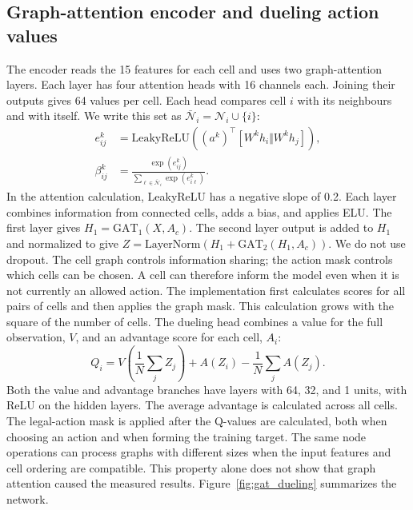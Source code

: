 \documentclass[fleqn,10pt,twoside]{IOEGC}
\begin{document}
\subsection{Graph-attention encoder and dueling action values}
The encoder reads the 15 features for each cell and uses two graph-attention layers. Each layer has four attention heads with 16 channels each. Joining their outputs gives 64 values per cell. Each head compares cell $i$ with its neighbours and with itself. We write this set as $\bar{\mathcal{N}}_i=\mathcal{N}_i\cup\{i\}$:
\begin{equation}
\begin{aligned}
 e_{ij}^{k}&=\mathrm{LeakyReLU}\!\left((a^k)^\top[W^kh_i\Vert W^kh_j]\right),\\
 \beta_{ij}^{k}&=\frac{\exp(e_{ij}^{k})}{\sum_{\ell\in\bar{\mathcal{N}}_i}\exp(e_{i\ell}^{k})}.
\end{aligned}
 \label{eq:attention}
\end{equation}
In the attention calculation, LeakyReLU has a negative slope of 0.2. Each layer combines information from connected cells, adds a bias, and applies ELU. The first layer gives $H_1=\mathrm{GAT}_1(X,A_c)$. The second layer output is added to $H_1$ and normalized to give $Z=\mathrm{LayerNorm}(H_1+\mathrm{GAT}_2(H_1,A_c))$. We do not use dropout. The cell graph controls information sharing; the action mask controls which cells can be chosen. A cell can therefore inform the model even when it is not currently an allowed action. The implementation first calculates scores for all pairs of cells and then applies the graph mask. This calculation grows with the square of the number of cells. The dueling head combines a value for the full observation, $V$, and an advantage score for each cell, $A_i$:
\begin{equation}
 Q_i=V\!\left(\frac{1}{N}\sum_j Z_j\right)+A(Z_i)-\frac{1}{N}\sum_j A(Z_j).
 \label{eq:dueling}
\end{equation}
Both the value and advantage branches have layers with 64, 32, and 1 units, with ReLU on the hidden layers. The average advantage is calculated across all cells. The legal-action mask is applied after the Q-values are calculated, both when choosing an action and when forming the training target. The same node operations can process graphs with different sizes when the input features and cell ordering are compatible. This property alone does not show that graph attention caused the measured results. Figure~\ref{fig:gat_dueling} summarizes the network.
\end{document}
